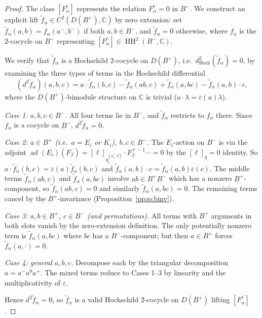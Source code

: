 \documentclass[11pt,letterpaper]{amsart}
\theoremstyle{plain}
\theoremstyle{definition}
\theoremstyle{remark}
\newcommand{\HH}{\operatorname{HH}}
\newcommand{\ad}{\operatorname{ad}}
\newcommand{\CC}{\mathbb{C}}
\newcommand{\bplus}{B^{+}}
\newcommand{\bminus}{B^{-}}
\begin{document}
\begin{proof}
The class $[F_\alpha^\ell]$ represents the relation $F_\alpha^\ell = 0$ in $\bminus$. We construct an explicit lift $\tilde{f}_\alpha \in C^2(D(\bplus), \CC)$ by zero extension: set $\tilde{f}_\alpha(a, b) = f_\alpha(a^-, b^-)$ if both $a, b \in \bminus$, and $\tilde{f}_\alpha = 0$ otherwise, where $f_\alpha$ is the $2$-cocycle on $\bminus$ representing $[F_\alpha^\ell] \in \HH^2(\bminus, \CC)$.

We verify that $\tilde{f}_\alpha$ is a Hochschild $2$-cocycle on $D(\bplus)$, i.e.\ $d^2_{\mathrm{Hoch}}(\tilde{f}_\alpha) = 0$, by examining the three types of terms in the Hochschild differential
\[
(d^2 \tilde{f}_\alpha)(a, b, c) = a \cdot \tilde{f}_\alpha(b, c) - \tilde{f}_\alpha(ab, c) + \tilde{f}_\alpha(a, bc) - \tilde{f}_\alpha(a, b) \cdot c,
\]
where the $D(\bplus)$-bimodule structure on $\CC$ is trivial ($a \cdot \lambda = \varepsilon(a) \lambda$).

\emph{Case 1: $a, b, c \in \bminus$.} All four terms lie in $\bminus$, and $\tilde{f}_\alpha$ restricts to $f_\alpha$ there. Since $f_\alpha$ is a cocycle on $\bminus$, $d^2 \tilde{f}_\alpha = 0$.

\emph{Case 2: $a \in \bplus$ (i.e.\ $a = E_i$ or $K_i$), $b, c \in \bminus$.} The $E_i$-action on $\bminus$ is via the adjoint $\ad(E_i)(F_\beta) = [\ell]_{q_i^{(\alpha_i^\vee, \beta)}} \cdot F_\beta^{\ell-1} \cdots = 0$ by the $[\ell]_q = 0$ identity. So $a \cdot \tilde{f}_\alpha(b, c) = \varepsilon(a) \tilde{f}_\alpha(b, c)$ and $\tilde{f}_\alpha(a, b) \cdot c = \tilde{f}_\alpha(a, b) \varepsilon(c)$. The middle terms $\tilde{f}_\alpha(ab, c)$ and $\tilde{f}_\alpha(a, bc)$ involve $ab \in \bplus \bminus$ which has a nonzero $\bplus$-component, so $\tilde{f}_\alpha(ab, c) = 0$ and similarly $\tilde{f}_\alpha(a, bc) = 0$. The remaining terms cancel by the $\bplus$-invariance (Proposition~\ref{prop:binv}).

\emph{Case 3: $a, b \in \bplus$, $c \in \bminus$ (and permutations).} All terms with $\bplus$ arguments in both slots vanish by the zero-extension definition. The only potentially nonzero term is $\tilde{f}_\alpha(a, bc)$ where $bc$ has a $\bminus$-component; but then $a \in \bplus$ forces $\tilde{f}_\alpha(a, \cdot) = 0$.

\emph{Case 4: general $a, b, c$.} Decompose each by the triangular decomposition $a = a^- a^0 a^+$. The mixed terms reduce to Cases 1--3 by linearity and the multiplicativity of $\varepsilon$.

Hence $d^2 \tilde{f}_\alpha = 0$, so $\tilde{f}_\alpha$ is a valid Hochschild $2$-cocycle on $D(\bplus)$ lifting $[F_\alpha^\ell]$.
\end{proof}
\end{document}

